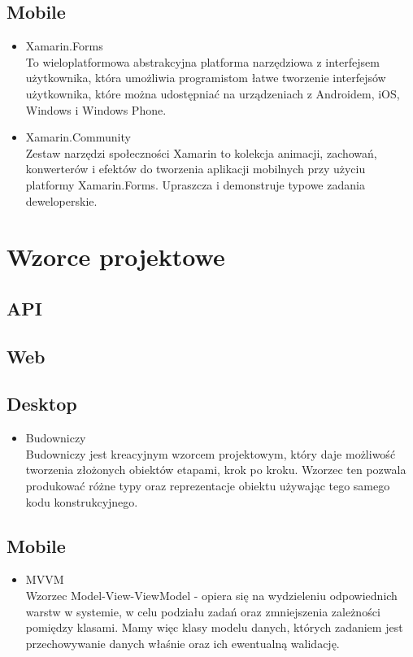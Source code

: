 \documentclass{article}
\begin{document}
    \subsection{Mobile}
     \begin{itemize}
            \item Xamarin.Forms\\
             To wieloplatformowa abstrakcyjna platforma narzędziowa z interfejsem użytkownika, która umożliwia programistom łatwe tworzenie interfejsów użytkownika, które można udostępniać na urządzeniach z Androidem, iOS, Windows i Windows Phone.
            \item Xamarin.Community\\
            Zestaw narzędzi społeczności Xamarin to kolekcja animacji, zachowań, konwerterów i efektów do tworzenia aplikacji mobilnych przy użyciu platformy Xamarin.Forms. Upraszcza i demonstruje typowe zadania deweloperskie.
             \end{itemize}


\section{Wzorce projektowe}
    \subsection{API}
       
        
    \subsection{Web}
        
        
    \subsection{Desktop}
    \begin{itemize}
           \item Budowniczy\\
             Budowniczy jest kreacyjnym wzorcem projektowym, który daje możliwość tworzenia złożonych obiektów etapami, krok po kroku. Wzorzec ten pozwala produkować różne typy oraz reprezentacje obiektu używając tego samego kodu konstrukcyjnego.
             \end{itemize}
    \subsection{Mobile}
    \begin{itemize}
           \item MVVM\\
             Wzorzec Model-View-ViewModel - opiera się na wydzieleniu odpowiednich warstw w systemie, w celu podziału zadań oraz zmniejszenia zależności pomiędzy klasami. Mamy więc klasy modelu danych, których zadaniem jest przechowywanie danych właśnie oraz ich ewentualną walidację.
             \end{itemize}
\end{document}
